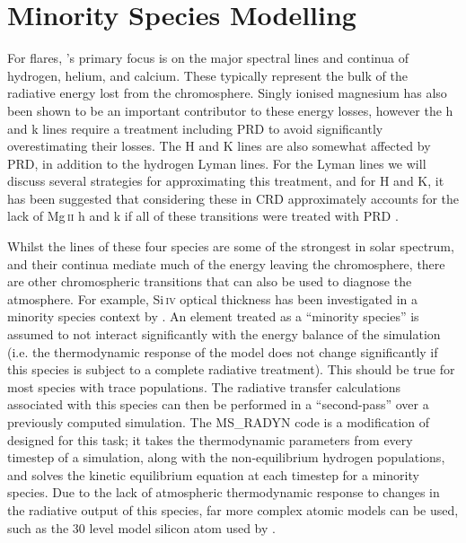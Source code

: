 \section{Minority Species Modelling}

For flares, \Radyn{}'s primary focus is on the major spectral lines and continua of hydrogen, helium, and calcium.
These typically represent the bulk of the radiative energy lost from the chromosphere.
Singly ionised magnesium has also been shown to be an important contributor to these energy losses, however the h and k lines require a treatment including PRD to avoid significantly overestimating their losses.
The \Caii{} H and K lines are also somewhat affected by PRD, in addition to the hydrogen Lyman lines.
For the Lyman lines we will discuss several strategies for approximating this treatment, and for \Caii{} H and K, it has been suggested that considering these in CRD approximately accounts for the lack of Mg\,\textsc{ii} h and k if all of these transitions were treated with PRD \citep{Kerr2019a}.

Whilst the lines of these four species are some of the strongest in solar spectrum, and their continua mediate much of the energy leaving the chromosphere, there are other chromospheric transitions that can also be used to diagnose the atmosphere.
For example, Si\,\textsc{iv} optical thickness has been investigated in a minority species context by \citet{Kerr2019c}.
An element treated as a ``minority species'' is assumed to not interact significantly with the energy balance of the simulation (i.e. the thermodynamic response of the model does not change significantly if this species is subject to a complete radiative treatment).
This should be true for most species with trace populations.
The radiative transfer calculations associated with this species can then be performed in a ``second-pass'' over a previously computed \Radyn{} simulation.
The MS\_RADYN code is a modification of \Radyn{} designed for this task; it takes the thermodynamic parameters from every timestep of a \Radyn{} simulation, along with the non-equilibrium hydrogen populations, and solves the kinetic equilibrium equation at each timestep for a minority species.
Due to the lack of atmospheric thermodynamic response to changes in the radiative output of this species, far more complex atomic models can be used, such as the 30 level model silicon atom used by \citet{Kerr2019c}.

